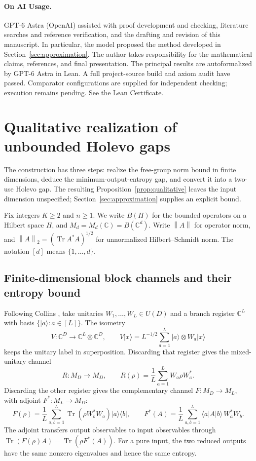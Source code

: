 \documentclass[11pt]{article}
\numberwithin{equation}{section}
\theoremstyle{boldremark}\newtheorem{remark}[theorem]{Remark}
\DeclareMathOperator{\Tr}{Tr}
\newcommand{\C}{\mathbb C}
\newcommand{\M}{M}
\newcommand{\norm}[1]{\left\lVert #1\right\rVert}
\newcommand{\ket}[1]{\lvert #1\rangle}
\newcommand{\bra}[1]{\langle #1\rvert}
\begin{document}
\paragraph{On AI Usage.}
GPT-6 Astra (OpenAI) assisted with proof development and checking,
literature searches and reference verification, and the drafting and
revision of this manuscript. In particular, the model proposed the
method developed in Section~\ref{sec:approximation}. The author takes
responsibility for the mathematical claims, references, and final
presentation. The principal results are autoformalized by GPT-6 Astra in Lean. A full project-source build and axiom audit have passed. Comparator configurations are supplied for independent checking; execution remains pending. See the \href{https://github.com/JWang226/Holevo-Additivity-Gap}{Lean Certificate}.

\section{Qualitative realization of unbounded Holevo gaps}
\label{sec:entropy}

The construction has three steps: realize the free-group norm bound
in finite dimensions, deduce the minimum-output-entropy gap, and
convert it into a two-use Holevo gap. The resulting
Proposition~\ref{prop:qualitative} leaves the input dimension
unspecified; Section~\ref{sec:approximation} supplies an explicit bound.

Fix integers $K\ge2$ and $n\ge1$. We write $B(H)$ for the bounded
operators on a Hilbert space $H$, and $\M_d=\M_d(\C)=B(\C^d)$.
Write $\norm A$ for operator norm,
and $\norm A_2=(\Tr A^*A)^{1/2}$ for unnormalized Hilbert--Schmidt norm.
The notation $[d]$ means $\{1,\ldots,d\}$.

\subsection{Finite-dimensional block channels and their entropy bound}
\label{sec:finite-entropy}

Following Collins \cite[Section~3.1]{Collins}, take unitaries
$W_1,\ldots,W_L\in U(D)$ and a branch register $\C^L$ with basis
$\{\ket a:a\in[L]\}$. The isometry
\[
 V:\C^D\longrightarrow\C^L\otimes\C^D,
 \qquad V\ket x=L^{-1/2}\sum_{a=1}^L\ket a\otimes W_a\ket x
\]
keeps the unitary label in superposition. Discarding that register
gives the mixed-unitary channel
\[
 R:\M_D\longrightarrow\M_D,
 \qquad R(\rho)=\frac1L\sum_{a=1}^L W_a\rho W_a^*.
\]
Discarding the other register gives the complementary channel
$F:\M_D\to\M_L$, with adjoint $F^*:\M_L\to\M_D$:
\begin{equation}
 F(\rho)=\frac1L\sum_{a,b=1}^L
       \Tr(\rho W_b^*W_a)\ket a\bra b,\qquad
 F^*(A)=\frac1L\sum_{a,b=1}^L\bra a A\ket b\,W_a^*W_b.
 \label{eq:gram}
\end{equation}
The adjoint transfers output observables to input observables through
$\Tr(F(\rho)A)=\Tr(\rho F^*(A))$. For a pure input, the two reduced
outputs have the same nonzero eigenvalues and hence the same entropy.
\end{document}
